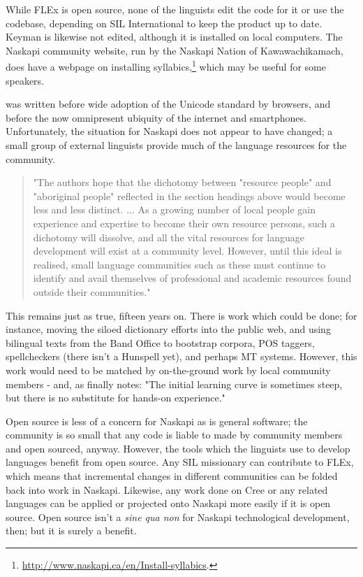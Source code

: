 While FLEx is open source, none of the linguists edit the code for it or use the codebase, depending on SIL International to keep the product up to date. Keyman is likewise not edited, although it is installed on local computers. The Naskapi community website, run by the Naskapi Nation of Kawawachikamach, does have a webpage on installing syllabics,\footnote{\href{http://www.naskapi.ca/en/Install-syllabics}{http://www.naskapi.ca/en/Install-syllabics}. } which may be useful for some speakers.

\citet{jancewicz2002applied} was written before wide adoption of the Unicode standard by browsers, and before the now omnipresent ubiquity of the internet and smartphones. Unfortunately, the situation for Naskapi does not appear to have changed; a small group of external linguists provide much of the language resources for the community.

\begin{quote}
"The authors hope that the dichotomy between "resource people" and "aboriginal people" reflected in the section headings above would become less and less distinct. ... As a growing number of local people gain experience and expertise to become their own resource persons, such a dichotomy will dissolve, and all the vital resources for language development will exist at a community level. However, until this ideal is realised, small language communities such as these must continue to identify and avail themselves of professional and academic resources found outside their communities." \citep[89]{jancewicz2002applied}
\end{quote}

This remains just as true, fifteen years on. There is work which could be done; for instance, moving the siloed dictionary efforts into the public web, and using bilingual texts from the Band Office to bootstrap corpora, POS taggers, spellcheckers (there isn't a Hunspell yet), and perhaps MT systems. However, this work would need to be matched by on-the-ground work by local community members - and, as \citet[90]{jancewicz2002applied} finally notes: "The initial learning curve is sometimes steep, but there is no substitute for hands-on experience."

Open source is less of a concern for Naskapi as is general software; the community is so small that any code is liable to made by community members and open sourced, anyway. However, the tools which the linguists use to develop languages benefit from open source. Any SIL missionary can contribute to FLEx, which means that incremental changes in different communities can be folded back into work in Naskapi. Likewise, any work done on Cree or any related languages can be applied or projected onto Naskapi more easily if it is open source. Open source isn't a {\it sine qua non} for Naskapi technological development, then; but it is surely a benefit.


